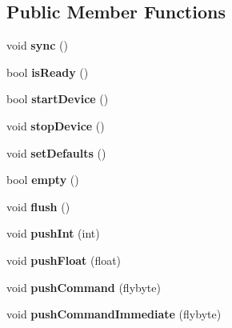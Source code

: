 \subsection*{Public Member Functions}
\begin{DoxyCompactItemize}
\item 
\hypertarget{class_demo_device_acaf7db1f334974938fe1854329ceb671}{}\label{class_demo_device_acaf7db1f334974938fe1854329ceb671} 
void {\bfseries sync} ()
\item 
\hypertarget{class_demo_device_aaadb9ced56699af55526b9fc7cf8420c}{}\label{class_demo_device_aaadb9ced56699af55526b9fc7cf8420c} 
bool {\bfseries is\+Ready} ()
\item 
\hypertarget{class_demo_device_af350ecf6ff289983cff9053197f1b1f2}{}\label{class_demo_device_af350ecf6ff289983cff9053197f1b1f2} 
bool {\bfseries start\+Device} ()
\item 
\hypertarget{class_demo_device_ab95434f7121f00789108f29a8457ec98}{}\label{class_demo_device_ab95434f7121f00789108f29a8457ec98} 
void {\bfseries stop\+Device} ()
\item 
\hypertarget{class_demo_device_a79a9c22e60aca99c7667990bedc461c8}{}\label{class_demo_device_a79a9c22e60aca99c7667990bedc461c8} 
void {\bfseries set\+Defaults} ()
\item 
\hypertarget{class_demo_device_a52de363ec31fdbb540cf7cae6f584d22}{}\label{class_demo_device_a52de363ec31fdbb540cf7cae6f584d22} 
bool {\bfseries empty} ()
\item 
\hypertarget{class_demo_device_ad8f0febf61290140dac5c2d9406c74fa}{}\label{class_demo_device_ad8f0febf61290140dac5c2d9406c74fa} 
void {\bfseries flush} ()
\item 
\hypertarget{class_demo_device_a81e90bedf726e6097425c709a6b80e04}{}\label{class_demo_device_a81e90bedf726e6097425c709a6b80e04} 
void {\bfseries push\+Int} (int)
\item 
\hypertarget{class_demo_device_a6d542539269417da29262722f831eff0}{}\label{class_demo_device_a6d542539269417da29262722f831eff0} 
void {\bfseries push\+Float} (float)
\item 
\hypertarget{class_demo_device_a11cc2baef119fadb70db244976781e11}{}\label{class_demo_device_a11cc2baef119fadb70db244976781e11} 
void {\bfseries push\+Command} (flybyte)
\item 
\hypertarget{class_demo_device_a147c6c8d126519b3895f7c08a5436e04}{}\label{class_demo_device_a147c6c8d126519b3895f7c08a5436e04} 
void {\bfseries push\+Command\+Immediate} (flybyte)
\item 

\end{DoxyCompactItemize}
